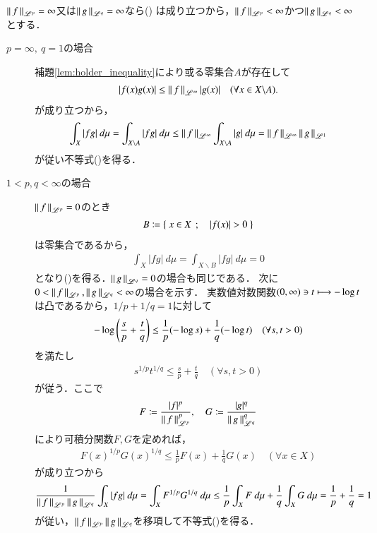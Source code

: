 \begin{prf}
	$\left\|\, f\, \right\|_{\mathscr{L}^p} = \infty$又は$\left\|\, g\, \right\|_{\mathscr{L}^q} = \infty$なら()
		は成り立つから，$\left\|\, f\, \right\|_{\mathscr{L}^p} < \infty$かつ$\left\|\, g\, \right\|_{\mathscr{L}^q} < \infty$とする．
	\begin{description}
		\item[$p = \infty,\ q = 1$の場合]
			補題\ref{lem:holder_inequality}により或る零集合$A$が存在して
			\begin{align}
				|f(x)g(x)| \leq \left\|\, f\, \right\|_{\mathscr{L}^\infty}|g(x)| \quad (\forall x \in X \backslash A).
			\end{align}
			が成り立つから，
			\begin{align}
				\int_{X} |fg|\ d\mu = \int_{X \backslash A} |fg|\ d\mu
				\leq \left\|\, f\, \right\|_{\mathscr{L}^\infty} \int_{X \backslash A} |g|\ d\mu 
				= \left\|\, f\, \right\|_{\mathscr{L}^\infty} \left\|\, g\, \right\|_{\mathscr{L}^1}
			\end{align}
			が従い不等式()を得る．
		
		\item[$1 < p,q < \infty$の場合]
			$\left\|\, f\, \right\|_{\mathscr{L}^p} = 0$のとき
			\begin{align}
				B \coloneqq \left\{\ x \in X\ \, ; \quad |f(x)| > 0\ \right\}
			\end{align}
			は零集合であるから，
			\begin{align}
				\int_{X} |fg|\ d\mu = \int_{X \backslash B} |fg|\ d\mu = 0
			\end{align}
			となり()を得る．$\left\|\, g\, \right\|_{\mathscr{L}^q} = 0$の場合も同じである．
			次に$0 < \left\|\, f\, \right\|_{\mathscr{L}^p},\left\|\, g\, \right\|_{\mathscr{L}^q} < \infty$の場合を示す．
			実数値対数関数$(0,\infty) \ni t \longmapsto -\operatorname{log} t$は凸であるから，$1/p + 1/q = 1$に対して
			\begin{align}
				-\operatorname{log} \left( \frac{s}{p} + \frac{t}{q} \right) \leq \frac{1}{p}(-\operatorname{log} s) + \frac{1}{q}(-\operatorname{log} t) \quad (\forall s,t > 0)
			\end{align}
			を満たし
			\begin{align}
				s^{1/p}t^{1/q} \leq \frac{s}{p} + \frac{t}{q} \quad (\forall s,t > 0)
			\end{align}
			が従う．ここで
			\begin{align}
				F \coloneqq \frac{|f|^p}{\left\|\, f\, \right\|_{\mathscr{L}^p}^p},
				\quad G \coloneqq \frac{|g|^q}{\left\|\, g\, \right\|_{\mathscr{L}^q}^q}
			\end{align}
			により可積分関数$F,G$を定めれば，
			\begin{align}
				F(x)^{1/p}G(x)^{1/q} \leq \frac{1}{p}F(x) + \frac{1}{q}G(x) \quad (\forall x \in X)
			\end{align}
			が成り立つから
			\begin{align}
				\frac{1}{\left\|\, f\, \right\|_{\mathscr{L}^p}\left\|\, g\, \right\|_{\mathscr{L}^q}}\int_{X} |fg|\ d\mu
				= \int_{X} F^{1/p}G^{1/q}\ d\mu
				\leq \frac{1}{p} \int_{X} F\ d\mu + \frac{1}{q} \int_{X} G\ d\mu
				= \frac{1}{p} + \frac{1}{q} = 1
			\end{align}
			が従い，$\left\|\, f\, \right\|_{\mathscr{L}^p}\left\|\, g\, \right\|_{\mathscr{L}^q}$を移項して不等式()を得る．
			\QED
	\end{description}
\end{prf}

